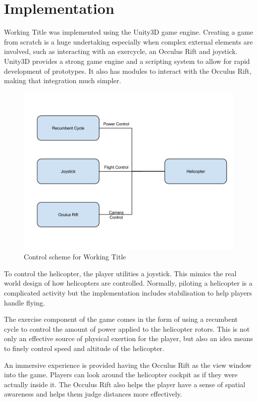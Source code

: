 \documentclass[11pt]{article}
\begin{document}
\section{Implementation}
\begin{multicols}{2}

Working Title was implemented using the Unity3D game engine. Creating a game from scratch is a huge undertaking especially when complex external elements are involved, such as interacting with an exercycle, an Occulus Rift and joystick. Unity3D provides a strong game engine and a scripting system to allow for rapid development of prototypes. It also has modules to interact with the Occulus Rift, making that integration much simpler.

\end{multicols}
\begin{figure}[H]
\centering
\includegraphics[scale=0.3]{diagram-1.png}
\caption{Control scheme for Working Title}
\end{figure}
\begin{multicols}{2}

To control the helicopter, the player utilities a joystick. This mimics the real world design of how helicopters are controlled. Normally, piloting a helicopter is a complicated activity but the implementation includes stabilisation to help players handle flying. 

The exercise component of the game comes in the form of using a recumbent cycle to control the amount of power applied to the helicopter rotors. This is not only an effective source of physical exertion for the player, but also an idea means to finely control speed and altitude of the helicopter.

An immersive experience is provided having the Occulus Rift as the view window into the game. Players can look around the helicopter cockpit as if they were actually inside it. The Occulus Rift also helps the player have a sense of spatial awareness and helps them judge distances more effectively.



\end{multicols}

\clearpage


\small

\end{document}

